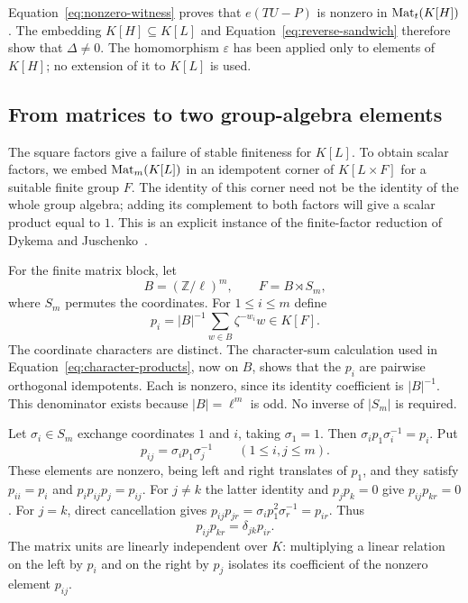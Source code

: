 Equation~\eqref{eq:nonzero-witness} proves that $e(TU-P)$ is nonzero in
$\operatorname{Mat}_t(K[H])$. The embedding $K[H]\subseteq K[L]$ and
Equation~\eqref{eq:reverse-sandwich} therefore show that $\Delta\ne0$.
The homomorphism $\varepsilon$ has been applied only to elements of
$K[H]$; no extension of it to $K[L]$ is used.

\subsection{From matrices to two group-algebra elements}

The square factors give a failure of stable finiteness for $K[L]$.
To obtain scalar factors, we embed $\operatorname{Mat}_m(K[L])$ in an idempotent
corner of $K[L\times F]$ for a suitable finite group $F$. The identity
of this corner need not be the identity of the whole group algebra;
adding its complement to both factors will give a scalar product equal
to $1$. This is an explicit instance of the finite-factor reduction
of Dykema and Juschenko~\cite[Theorem~2.2]{DykemaJuschenko2015}.

For the finite matrix block, let
\begin{equation}
\label{eq:finite-auxiliary-group}
B=(\mathbb Z/\ell)^m,
\qquad
F=B\rtimes S_m,
\end{equation}
where $S_m$ permutes the coordinates. For $1\le i\le m$ define
\begin{equation}
\label{eq:coordinate-idempotents}
p_i=|B|^{-1}\sum_{w\in B}\zeta^{-w_i}w\in K[F].
\end{equation}
The coordinate characters are distinct. The character-sum calculation
used in Equation~\eqref{eq:character-products}, now on $B$, shows that
the $p_i$ are pairwise orthogonal idempotents. Each is nonzero, since its
identity coefficient is $|B|^{-1}$. This denominator exists because
$|B|=\ell^m$ is odd. No inverse of $|S_m|$ is required.

Let $\sigma_i\in S_m$ exchange coordinates $1$ and $i$, taking
$\sigma_1=1$. Then $\sigma_i p_1\sigma_i^{-1}=p_i$. Put
\begin{equation}
\label{eq:finite-matrix-units}
p_{ij}=\sigma_i p_1\sigma_j^{-1}\qquad(1\le i,j\le m).
\end{equation}
These elements are nonzero, being left and right translates of $p_1$,
and they satisfy $p_{ii}=p_i$ and $p_i p_{ij}p_j=p_{ij}$.
For $j\ne k$ the latter identity and $p_jp_k=0$ give
$p_{ij}p_{kr}=0$. For $j=k$, direct cancellation gives
$p_{ij}p_{jr}=\sigma_i p_1^2\sigma_r^{-1}=p_{ir}$. Thus
\begin{equation}
\label{eq:matrix-unit-products}
p_{ij}p_{kr}=\delta_{jk}p_{ir}.
\end{equation}
The matrix units are linearly independent over $K$: multiplying a
linear relation on the left by $p_i$ and on the right by $p_j$ isolates
its coefficient of the nonzero element $p_{ij}$.

